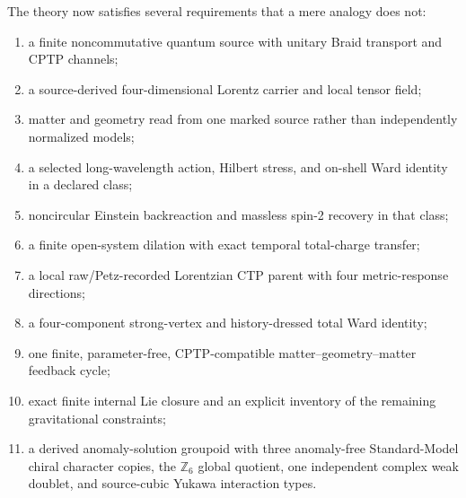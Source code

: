 \documentclass[11pt]{article}
\theoremstyle{definition}
\theoremstyle{remark}
\begin{document}
The theory now satisfies several requirements that a mere analogy does not:
\begin{enumerate}
\item a finite noncommutative quantum source with unitary Braid transport and CPTP channels;
\item a source-derived four-dimensional Lorentz carrier and local tensor field;
\item matter and geometry read from one marked source rather than independently normalized models;
\item a selected long-wavelength action, Hilbert stress, and on-shell Ward identity in a declared class;
\item noncircular Einstein backreaction and massless spin-2 recovery in that class;
\item a finite open-system dilation with exact temporal total-charge transfer;
\item a local raw/Petz-recorded Lorentzian CTP parent with four metric-response directions;
\item a four-component strong-vertex and history-dressed total Ward identity;
\item one finite, parameter-free, CPTP-compatible matter--geometry--matter feedback cycle;
\item exact finite internal Lie closure and an explicit inventory of the remaining gravitational constraints;
\item a derived anomaly-solution groupoid with three anomaly-free Standard-Model chiral character copies, the $\mathbb Z_6$ global quotient, one independent complex weak doublet, and source-cubic Yukawa interaction types.
\end{enumerate}
\end{document}
